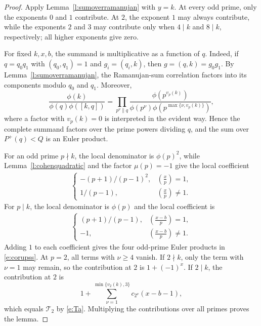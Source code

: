 \documentclass[12pt,reqno]{amsart}
\numberwithin{equation}{section}
\theoremstyle{definition}
\theoremstyle{remark}
\begin{document}
\begin{proof}
Apply Lemma~\ref{l:sumoverramanujan} with $y=k$. At every odd prime, only the exponents \(0\) and \(1\) contribute.
At \(2\), the exponent \(1\) may always contribute, while the exponents
\(2\) and \(3\) may contribute only when \(4\mid k\) and \(8\mid k\),
respectively; all higher exponents give zero.

For fixed $k,x,b$, the summand is multiplicative as a function of $q$.
Indeed, if $q=q_0q_1$ with $(q_0,q_1)=1$ and
$g_i=(q_i,k)$, then $g=(q,k)=g_0g_1$.  By
Lemma~\ref{l:sumoverramanujan}, the Ramanujan-sum correlation factors
into its components modulo $q_0$ and $q_1$.  Moreover,
\[
 \frac{\phi(k)}{\phi(q)\phi([k,q])}
 =
 \prod_{p^\nu\parallel q}
 \frac{\phi(p^{v_p(k)})}
 {\phi(p^\nu)\phi(p^{\max\{\nu,v_p(k)\}})},
\]
where a factor with $v_p(k)=0$ is interpreted in the evident way.
Hence the complete summand factors over the prime powers dividing $q$,
and the sum over $P^+(q)<Q$ is an Euler product.

For an odd prime $p\nmid k$, the local denominator is
$\phi(p)^2$, while Lemma~\ref{l:cohenquadratic} and the factor
$\mu(p)=-1$ give the local coefficient
\begin{align*}
 \begin{cases}
  -(p+1)/(p-1)^2,&(\frac xp)=1,\\
  1/(p-1),&(\frac xp)\ne1.
 \end{cases}
\end{align*}
For $p\mid k$, the local denominator is $\phi(p)$ and the local
coefficient is
\begin{align*}
 \begin{cases}
  (p+1)/(p-1),&(\frac{x-b}{p})=1,\\
  -1,&(\frac{x-b}{p})\ne1.
 \end{cases}
\end{align*}
Adding $1$ to each coefficient gives the four odd-prime Euler products 
in \eqref{e:corupss}. At \(p=2\), all terms with \(\nu\geq4\) vanish.  If \(2\nmid k\),
only the term with \(\nu=1\) may remain, so the contribution at \(2\)
is \(1+(-1)^x\).  If \(2\mid k\), the contribution at \(2\) is
\[
 1+\sum_{\nu=1}^{\min\{v_2(k),3\}}c_{2^\nu}(x-b-1),
\]
which equals \(\mathcal T_2\) by \eqref{e:Ta}.  Multiplying the
contributions over all primes proves the lemma.
\end{proof}
\end{document}
